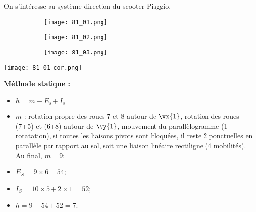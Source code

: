 \normaltrue \difficilefalse \tdifficilefalse
\correctiontrue

\setcounter{question}{0}%


\ifcorrection
\else
{}
\fi


\ifprof
\else
On s'intéresse au système direction du scooter Piaggio.
\begin{figure*}[!h]
\centering
\begin{subfigure}[c]{.3\linewidth}
\centering
\texttt{[image: 81\_01.png]}
\end{subfigure} \hfill
\begin{subfigure}[c]{.3\linewidth}
\centering
\texttt{[image: 81\_02.png]}
\end{subfigure} \hfill
\begin{subfigure}[c]{.3\linewidth}
\centering
\texttt{[image: 81\_03.png]}
\end{subfigure} 
\end{figure*}
\fi

\ifprof
\begin{center}
\texttt{[image: 81\_01\_cor.png]}
\end{center}
\else
\fi

\ifprof

\textbf{Méthode statique :}
\begin{itemize}
\item $h = m -E_s + I_s$ 
\item $m$ : rotation propre des roues 7 et 8 autour de $\vx{1}$, rotation des roues (7+5) et (6+8) autour de $\vy{1}$,  mouvement du parallèlogramme (1 rotatation), si toutes les liaisons pivots sont bloquées, il reste 2 ponctuelles en parallèle par rapport au sol, soit une liaison linéaire rectiligne (4 mobilités). Au final, $m=9$;
\item $E_S =9\times 6 = 54$;
\item $I_S = 10\times 5 + 2 \times 1 = 52$;
\item $h = 9 -54 + 52 = 7$.
\end{itemize}

